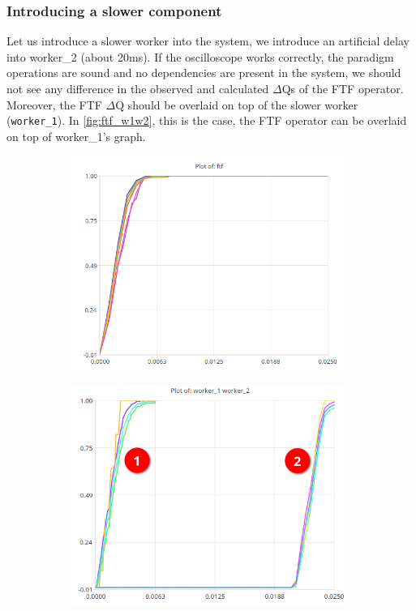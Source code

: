         \subsubsection{Introducing a slower component}
            Let us introduce a slower worker into the system, we introduce an artificial delay into worker\_2 (about 20ms). If the oscilloscope works correctly, the paradigm operations are sound and no dependencies are present in the system, we should not see any difference in the observed and calculated $\Delta$Qs of the FTF operator. Moreover, the FTF $\Delta$Q should be overlaid on top of the slower worker (\texttt{worker\_1}). In \cref{fig:ftf_w1w2}, this is the case, the FTF operator can be overlaid on top of worker\_1's graph. 

            \begin{figure}[H]
                \centering 
                \begin{subfigure}{.5\textwidth}
                    \centering
                    \includegraphics[width =0.98\textwidth]{img/ftf.png}
                    \label{fig:ftf_art_d}
                \end{subfigure}%
                \begin{subfigure}{.5\textwidth}%
                    \centering%
                    \includegraphics[width =0.98\textwidth]{img/delay32.png}%

\end{subfigure}
\end{figure}
